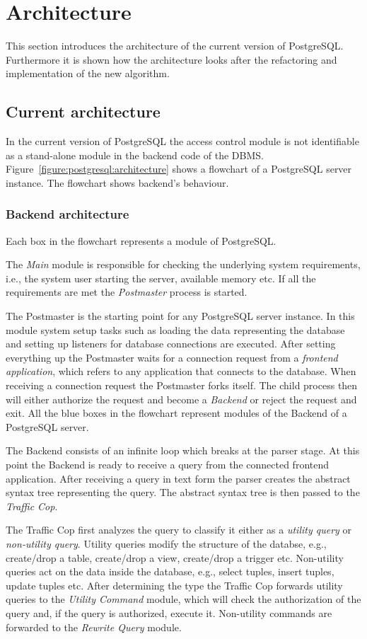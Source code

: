 \section{Architecture}
%
This section introduces the architecture of the current version of PostgreSQL.
%
Furthermore it is shown how the architecture looks after the refactoring and implementation of the new algorithm.
%
\subsection{Current architecture}
%
In the current version of PostgreSQL the access control module is not identifiable as a stand-alone module in the backend code of the DBMS.
%
Figure~\ref{figure:postgresql:architecture} shows a flowchart of a PostgreSQL server instance.
%
The flowchart shows backend's behaviour.
%
\subsubsection{Backend architecture}
%
Each box in the flowchart represents a module of PostgreSQL.

The \emph{Main} module is responsible for checking the underlying system requirements, i.e., the system user starting the server, available memory etc. If all the requirements are met the \emph{Postmaster} process is started.

The Postmaster is the starting point for any PostgreSQL server instance. 
%
In this module system setup tasks such as loading the data representing the database and setting up listeners for database connections are executed.
%
After setting everything up the Postmaster waits for a connection request from a \emph{frontend application}, which refers to any application that connects to the database.
%
When receiving a connection request the Postmaster forks itself.
%
The child process then will either authorize the request and become a \emph{Backend} or reject the request and exit.
%
All the blue boxes in the flowchart represent modules of the Backend of a PostgreSQL server.

The Backend consists of an infinite loop which breaks at the parser stage.
%
At this point the Backend is ready to receive a query from the connected frontend application.
%
After receiving a query in text form the parser creates the abstract syntax tree representing the query.
%
The abstract syntax tree is then passed to the \emph{Traffic Cop}.

The Traffic Cop first analyzes the query to classify it either as a \emph{utility query} or \emph{non-utility query}.
%
Utility queries modify the structure of the databse, e.g., create/drop a table, create/drop a view, create/drop a trigger etc.
%
Non-utility queries act on the data inside the database, e.g., select tuples, insert tuples, update tuples etc.
%
After determining the type the Traffic Cop forwards utility queries to the \emph{Utility Command} module, which will check the authorization of the query and, if the query is authorized, execute it.
%
Non-utility commands are forwarded to the \emph{Rewrite Query} module.

